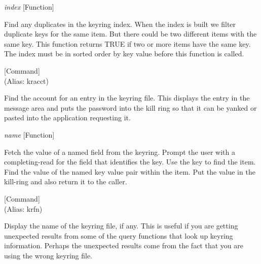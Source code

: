 \vspace{1em}
\noindent
{}
\usebox{\funcname}\emph{index}
 \hfill [Function]

\begin{doc-string}
Find any duplicates in the keyring index.  When the index is built we filter duplicate
keys for the same item.  But there could be two different items with the same key.  This
function returns TRUE if two or more items have the same key.  The index must be in sorted
order by key value before this function is called.
\end{doc-string}

\vspace{1em}
\noindent
{}
\usebox{\funcname}
 \hfill [Command]\\%
 (Alias: kracct)

\begin{doc-string}
Find the account for an entry in the keyring file.  This displays the entry in the message
area and puts the password into the kill ring so that it can be yanked or pasted into the application
requesting it.
\end{doc-string}

\vspace{1em}
\noindent
{}
\usebox{\funcname}\emph{name}
 \hfill [Function]

\begin{doc-string}
Fetch the value of a named field from the keyring.  Prompt the user with a completing-read
for the field that identifies the key.  Use the key to find the item.  Find the value of the named
key value pair within the item.  Put the value in the kill-ring and also return it to the caller.
\end{doc-string}

\vspace{1em}
\noindent
{}
\usebox{\funcname}
 \hfill [Command]\\%
 (Alias: krfn)

\begin{doc-string}
Display the name of the keyring file, if any.  This is useful if you are
getting unexpected results from some of the query functions that look up keyring
information.  Perhaps the unexpected results come from the fact that you are
using the wrong keyring file.
\end{doc-string}

